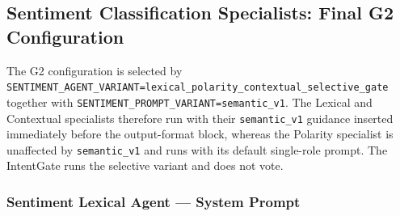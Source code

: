 \subsection{Sentiment Classification Specialists: Final G2 Configuration}
\label{app:prompts:sentiment-g2}

The G2 configuration is selected by
\texttt{SENTIMENT\_AGENT\_VARIANT=lexical\_polarity\_contextual\_selective\_gate}
together with \texttt{SENTIMENT\_PROMPT\_VARIANT=semantic\_v1}. The Lexical and
Contextual specialists therefore run with their \texttt{semantic\_v1} guidance
inserted immediately before the output-format block, whereas the Polarity
specialist is unaffected by \texttt{semantic\_v1} and runs with its default
single-role prompt. The IntentGate runs the selective variant and does not vote.

\subsubsection{Sentiment Lexical Agent --- System Prompt}

